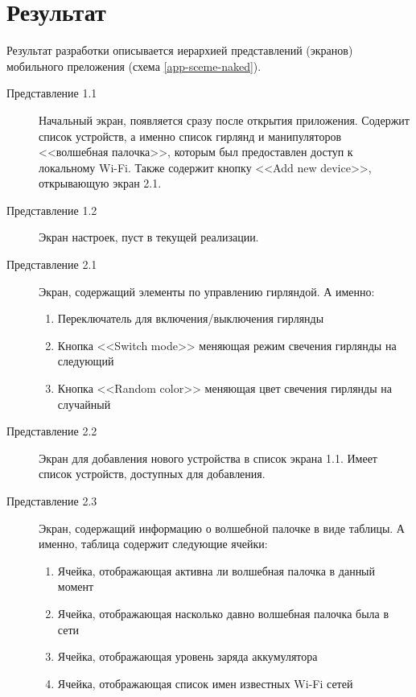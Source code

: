  \section{Результат}
  Результат разработки описывается иерархией представлений (экранов) мобильного преложения (схема \ref{app-sceme-naked}).
  \begin{description}
  \item [Представление 1.1] Начальный экран, появляется сразу после открытия приложения. Содержит список устройств, а именно список гирлянд и манипуляторов <<волшебная палочка>>, которым был предоставлен доступ к локальному Wi-Fi. Также содержит кнопку <<Add new device>>, открывающую экран 2.1.
  \item [Представление 1.2] Экран настроек, пуст в текущей реализации.
  \item [Представление 2.1] Экран, содержащий элементы по управлению гирляндой. А именно:
  \begin{enumerate} 
    \item Переключатель для включения/выключения гирлянды
    \item Кнопка <<Switch mode>> меняющая режим свечения гирлянды на следующий
    \item Кнопка <<Random color>> меняющая цвет свечения гирлянды на случайный
\end{enumerate}
  \item [Представление 2.2] Экран для добавления нового устройства в список экрана 1.1. Имеет список устройств, доступных для добавления.
  \item [Представление 2.3] Экран, содержащий информацию о волшебной палочке в виде таблицы. А именно, таблица содержит следующие ячейки:
\begin{enumerate} 
    \item Ячейка, отображающая активна ли волшебная палочка в данный момент
    \item Ячейка, отображающая насколько давно волшебная палочка была в сети
    \item Ячейка, отображающая уровень заряда аккумулятора
    \item Ячейка, отображающая список имен известных Wi-Fi сетей
   

\end{enumerate}
\end{description}
